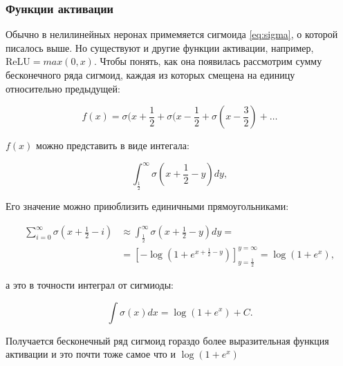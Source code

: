 \subsubsection{Функции активации}

Обычно в нелилинейных неронах примемяется сигмоида \ref{eq:sigma}, о которой писалось выше. Но существуют и
другие функции активации, например, $\text{ReLU} = max(0, x)$. Чтобы понять, как она появилась рассмотрим
сумму бесконечного ряда сигмоид, каждая из которых смещена на единицу относительно предыдущей:

\begin{equation*}
 f(x) = \sigma(x+\frac{1}{2} + \sigma(x-\frac{1}{2} + \sigma(x-\frac{3}{2}) + \ldots
\end{equation*}

$f(x)$ можно представить в виде интегала:

\begin{equation*}
 \int_\frac{1}{2}^\infty \sigma(x+\frac{1}{2}-y)dy,
\end{equation*}

Его значение можно приюблизить единичными прямоугольниками:

\begin{equation*}
\begin{aligned}
  \sum_{i=0}^\infty \sigma(x+\frac{1}{2}-i) & \approx \int_\frac{1}{2}^\infty \sigma(x+\frac{1}{2}-y)dy = \\
  & = \left[-\log (1+e^{x+\frac{1}{2}-y})\right]^{y=\infty}_{y=\frac{1}{2}} = \log (1+e^x),
\end{aligned}
\end{equation*}

а это в точности интеграл от сигмиоды:

\begin{equation*}
 \int \sigma (x) dx = \log(1+e^x) + C.
\end{equation*}

Получается бесконечный ряд сигмоид гораздо более выразительная функция активации и это почти тоже самое что и
$\log(1+e^x)$



